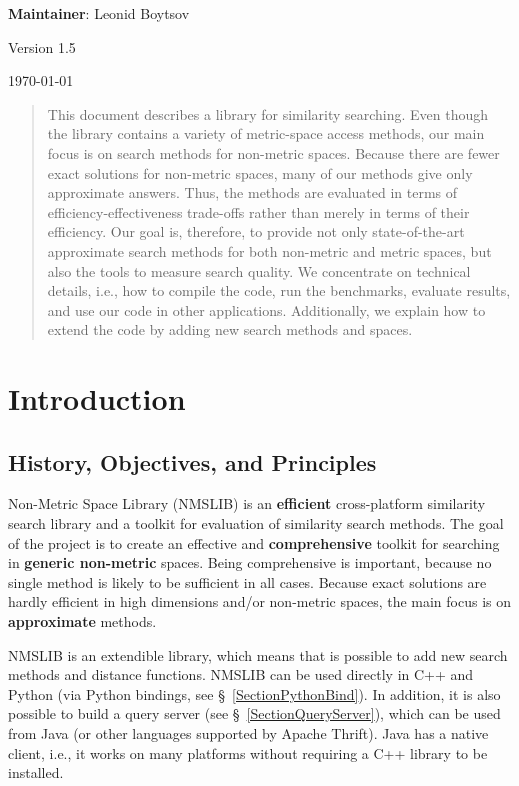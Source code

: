 \documentclass[runningheads,a4paper]{llncs}
\newcommand{\LibVersion}{1.5}
\begin{document}
{\begin{center}{\small \textbf{Maintainer}: Leonid Boytsov}\end{center}}
{\begin{center}{Version \LibVersion}\end{center} 
{\begin{center}{{\today}}\end{center}}

\begin{abstract}
This document describes a library for similarity searching.
Even though the library contains a variety of metric-space access methods,
our main focus is on search methods for non-metric spaces.
Because there are fewer exact solutions for non-metric spaces,
many of our methods give only approximate answers. 
Thus, the methods
are evaluated in terms of efficiency-effectiveness trade-offs
rather than merely in terms of their efficiency.
Our goal is, therefore, to provide
not only state-of-the-art approximate search methods for 
both non-metric and metric spaces,
but also the tools to measure search quality.
We concentrate on technical details, i.e., 
how to compile the code, run the benchmarks, evaluate results,
and use our code in other applications.
Additionally, we explain how to extend the code by adding
new search methods and spaces.
\end{abstract}

\section{Introduction}

\subsection{History, Objectives, and Principles}
Non-Metric Space Library (NMSLIB) is an \textbf{efficient} cross-platform similarity search library and a toolkit for evaluation of similarity search methods.  The goal of the project is to create an effective and \textbf{comprehensive} toolkit for searching in \textbf{generic non-metric} spaces.
Being comprehensive is important, because no single method is likely to be sufficient in all cases.
Because exact solutions are hardly efficient in high dimensions and/or non-metric spaces, the main focus is on \textbf{approximate} methods. 

NMSLIB is an extendible library, which means that is possible to add new search methods and distance functions. 
NMSLIB can be used directly in C++ and Python (via Python bindings, see \S~\ref{SectionPythonBind}). In addition, it is also possible to build a query server (see \S~\ref{SectionQueryServer}), which can be used from Java (or other languages supported by Apache Thrift). Java has a native client, i.e., it works on many platforms without requiring a C++ library to be installed.

}
\end{document}
